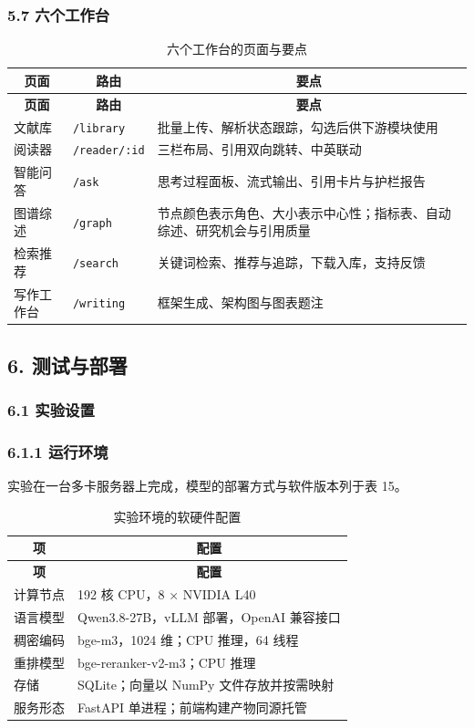 \documentclass[UTF8,fontset=windows,zihao=5,a4paper]{ctexart}
\begin{document}
\subsubsection*{5.7 六个工作台}
\begin{longtable}{@{}p{}p{}p{}@{}}
\caption{六个工作台的页面与要点}\\
\toprule
\multicolumn{1}{c}{\textbf{页面}} & \multicolumn{1}{c}{\textbf{路由}} & \multicolumn{1}{c}{\textbf{要点}} \\
\midrule
\endfirsthead
\toprule
\multicolumn{1}{c}{\textbf{页面}} & \multicolumn{1}{c}{\textbf{路由}} & \multicolumn{1}{c}{\textbf{要点}} \\
\midrule
\endhead
\bottomrule
\endfoot
文献库 & \texttt{/library} & 批量上传、解析状态跟踪，勾选后供下游模块使用 \\
阅读器 & \texttt{/reader/:id} & 三栏布局、引用双向跳转、中英联动 \\
智能问答 & \texttt{/ask} & 思考过程面板、流式输出、引用卡片与护栏报告 \\
图谱综述 & \texttt{/graph} & 节点颜色表示角色、大小表示中心性；指标表、自动综述、研究机会与引用质量 \\
检索推荐 & \texttt{/search} & 关键词检索、推荐与追踪，下载入库，支持反馈 \\
写作工作台 & \texttt{/writing} & 框架生成、架构图与图表题注 \\
\end{longtable}

\subsection*{6. 测试与部署}
\subsubsection*{6.1 实验设置}
\subsubsection*{6.1.1 运行环境}
实验在一台多卡服务器上完成，模型的部署方式与软件版本列于表 15。

\begin{longtable}{@{}p{}p{}@{}}
\caption{实验环境的软硬件配置}\\
\toprule
\multicolumn{1}{c}{\textbf{项}} & \multicolumn{1}{c}{\textbf{配置}} \\
\midrule
\endfirsthead
\toprule
\multicolumn{1}{c}{\textbf{项}} & \multicolumn{1}{c}{\textbf{配置}} \\
\midrule
\endhead
\bottomrule
\endfoot
计算节点 & 192 核 CPU，8 × NVIDIA L40 \\
语言模型 & Qwen3.8-27B，vLLM 部署，OpenAI 兼容接口 \\
稠密编码 & bge-m3，1024 维；CPU 推理，64 线程 \\
重排模型 & bge-reranker-v2-m3；CPU 推理 \\
存储 & SQLite；向量以 NumPy 文件存放并按需映射 \\
服务形态 & FastAPI 单进程；前端构建产物同源托管 \\
\end{longtable}
\end{document}

